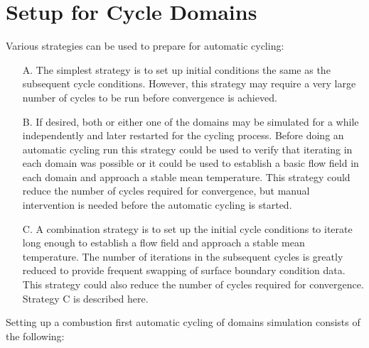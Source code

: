 \documentclass[12pt]{article}
\numberwithin{equation}{section}
\begin{document}
\section{Setup for Cycle Domains}
\label{sec:setup}

Various strategies can be used to prepare for automatic cycling:
\noindent
\begin{enumerate}
	\item[A.] The simplest strategy is to set up initial conditions the same as the subsequent cycle conditions. However, this strategy may require a very large number of cycles to be run before convergence is achieved.
	\item[B.] If desired, both or either one of the domains may be simulated for a while independently and later restarted for the cycling process. Before doing an automatic cycling run this strategy could be used to verify that iterating in each domain was possible or it could be used to establish a basic flow field in each domain and approach a stable mean temperature. This strategy could reduce the number of cycles required for convergence, but manual intervention is needed before the automatic cycling is started.
	\item[C.] A combination strategy is to set up the initial cycle conditions to iterate long enough to establish a flow field and approach a stable mean temperature. The number of iterations in the subsequent cycles is greatly reduced to provide frequent swapping of surface boundary condition data. This strategy could also reduce the number of cycles required for convergence. Strategy C is described here.
\end{enumerate} 

\noindent
Setting up a combustion first automatic cycling of domains simulation consists of the following: 
\end{document}
